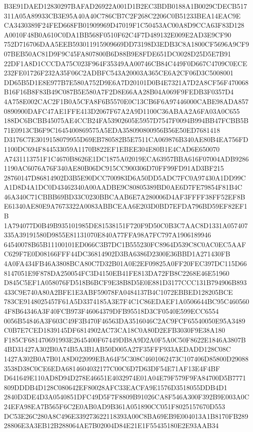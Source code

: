 \documentclass[UTF8,fontset=fandol,zihao=-4,a4paper]{ctexart}
\begin{document}
{{B3E91DAED12830297BAFAD26922A001D1B2EC3BDB0188A1B0029CDECB517311A05A89933CB3E95A40A40C786CB7C2F268C2206C0B51233BEA14EAC9E
CA3430389F24FED668FB01909969D47019F1C50453AC00A8D9CCA63F83D128A0010F48B0A610C0DA1BB568F0510F62C4F7D489132E009E2AD3E9CF90
752D716706DAA5EEB593011915909669DD73198D3EDB3C8A1800CF5696A9CF907BEB50AC81D9F9C45FA807800B6D88B9E8FDE651DC0028D25D5E7B91
22DF1A8D1CCCDA75C023F964F35349AA00746CB84C449F0D667C4709C0ECE232FE01726F232A35F06C2ADBFC543A20003A365CE6A2CF06D3C5008001
DD65B5D1E8E977B7E580A752D9E6A7D20101D0B4E7321A7D2A8CF56F470068B16F16B8F83B49C087B5E580A7F2D8E66AA28B04A069F9FEDB3F0357D4
4A758E002CAC2F1B0A5CFA8F6B5570E0C13CB6F6A97446000CABE98ADA8570890900DAFC47AE1FFE413D2067F67A2A9D1100C36ABAA2A6FA03A0C655
188DC6BCBB45075AE4CCB24FA53902605E5957D7547F0094B994BB47FCBB5B71E0913CB6F9C1645400869575A5EDA358090800956B56E50ED7681418
D3176C7E3019158079955D69EB780582B5E7511CA069876B340AE80B4EA756FD1100DC694F844533059A1170B822EF1EBEE304E80B1E4CAD6E650070
A7431113751F1C4670B8626E1DC1875A02019ECA63957BBA616F07004ADB92861190AC6076A76F340AE80B06DC915CC900306D70FF99FD91AD3BF215
28760147D86814902D3B5E90DCC700983D6A50DD5ADC7FC0A97430A1DD99CA1D8D4A1DC0D43462340A00AADBE9C80805389BD0AE6D7FE79854F81B4C
46A340C71CBBB69BD33C0230BBCAAB6E7A280006D4AF3FFFF38FF52EF8BE61340AE80E9A7673322A0083ABBCEAA6E203D0BD7EFDA796BD59EF82EF1B
1A794077D0B49B935101985DE81538151F720F9D50C0B3C7AAC8D1331A057407335A39191580D9855E81131070E840A77FFA98A7FC797A1906189946
64540078B65B11100101ED066C3B7DC1B555230FC8964D539C8C0AC0EC5AAFC629F7E0D08166FFF44DC36814902D3BA6386D2300E36BBD1A271430FB
4A0FA434FB46A3808BCA80C7D32B01A0E2EF09825A0FF20FEC397DC115D668147051E9F878DA250054FC3D4150EB41FE813DA72FB8C2268E46E51960
D845C5EF1A058076FD518B6BCF9E38B8D5E0E881D3177CCC131B794906B893433C9E740A80A2BFE1E3ABF59078FA0484137B4C1072EBBED128205BCE
783CE9148025457F61A5D3374185A3E7F4C1C86EDAEF1A0506644BC95C4605604F8B64346A3F40FCB973F46064379DFB95518D3CF0540E599ECC6554
0056B54846A3F603C49F3B470F46563DA3516046C2AC9FCF65540050E95A3489C0B7E7CED1839145DF6814902AC73CA18C0A80D2EFB3030F9E38A180
F185CF681470691993E2645400F67449DB8A9D2A0F5A0C50F8622E1846A3807B4BD31427A302B0A74B5A3B1AB50D005A27F35FFF933AEDADD128C08C
1427A302B0A7B01A8D022099EBA64F5C308C4601062473C107406D85800D290883538D38C0CE6EDA6814604032177C00C6D7D63DF54E71AF13E4F4BF
D641649E110AD8D94D278E46651E4032974E01A04E79F579F9FA84700D5B7771809DDDB4D128C080642EF80028AFC33EACFA9E1576D3518055DDB4D1
2840D3DE4D3A0540851DFC49D5F7F8809B91026CA8F546A300F392B9E003A0C24EFA98EA7B565F6C2E0AB0AD9B361A051890CC051F8025157670D553
DC53E26C280A8C496E339273622118393A00C8BA69EB9E004013A1B8170FB28928806E3A3EB12B288064AE7B02004D84E21E1F55435180E2E93AAB34
}}
\end{document}
